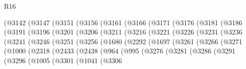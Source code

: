 \begin{lexlean}{R16}
\begin{coremodule}
        (@3142
          (@3147
            (@3151
              (@3156
                (@3161
                  (@3166
                    (@3171
                      (@3176
                        (@3181
                          (@3186
                            (@3191
                              (@3196
                                (@3201
                                  (@3206
                                    (@3211
                                      (@3216
                                        (@3221
                                          (@3226
                                            (@3231
                                              (@3236
                                                (@3241
                                                  (@3246
                                                    (@3251
                                                      (@3256
                                                        (@1680
                                                          (@2292
                                                            (@1697
                                                              (@3261
                                                                (@3266
                                                                  (@3271
                                                                    (@1000
                                                                      (@2318
                                                                        (@2433
                                                                          (@2438
                                                                            (@964
                                                                              (@995
                                                                                (@3276
                                                                                  (@3281
                                                                                    (@3286
                                                                                      (@3291
                                                                                        (@3296
                                                                                          (@1005
                                                                                            (@3301
                                                                                              (@1041
                                                                                                (@3306

\end{coremodule}
\end{lexlean}
